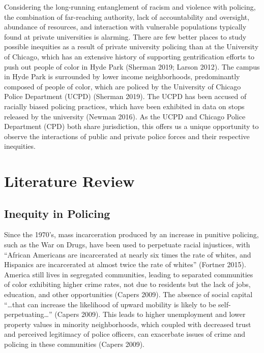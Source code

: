 \documentclass{ucetd}
\begin{document}
Considering the long-running entanglement of racism and violence with
policing, the combination of far-reaching authority, lack of
accountability and oversight, abundance of resources, and interaction
with vulnerable populations typically found at private universities is
alarming. There are few better places to study possible inequities as a
result of private university policing than at the University of Chicago,
which has an extensive history of supporting gentrification efforts to
push out people of color in Hyde Park (Sherman 2019; Larson 2012). The
campus in Hyde Park is surrounded by lower income neighborhoods,
predominantly composed of people of color, which are policed by the
University of Chicago Police Department (UCPD) (Sherman 2019). The UCPD
has been accused of racially biased policing practices, which have been
exhibited in data on stops released by the university (Newman 2016). As
the UCPD and Chicago Police Department (CPD) both share jurisdiction,
this offers us a unique opportunity to observe the interactions of
public and private police forces and their respective inequities.

\hypertarget{literature-review}{%
\chapter{Literature Review}\label{literature-review}}

\hypertarget{inequity-in-policing}{%
\section{Inequity in Policing}\label{inequity-in-policing}}

Since the 1970's, mass incarceration produced by an increase in punitive
policing, such as the War on Drugs, have been used to perpetuate racial
injustices, with ``African Americans are incarcerated at nearly six
times the rate of whites, and Hispanics are incarcerated at almost twice
the rate of whites'' (Fortner 2015). America still lives in segregated
communities, leading to separated communities of color exhibiting higher
crime rates, not due to residents but the lack of jobs, education, and
other opportunities (Capers 2009). The absence of social capital
``\ldots that can increase the likelihood of upward mobility is likely
to be self-perpetuating\ldots{}'' (Capers 2009). This leads to higher
unemployment and lower property values in minority neighborhoods, which
coupled with decreased trust and perceived legitimacy of police
officers, can exacerbate issues of crime and policing in these
communities (Capers 2009).
\end{document}
